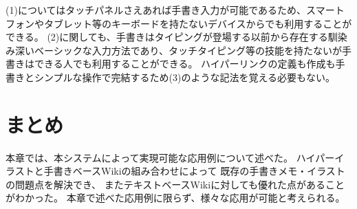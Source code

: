 (1)についてはタッチパネルさえあれば手書き入力が可能であるため、スマートフォンやタブレット等のキーボードを持たないデバイスからでも利用することができる。
(2)に関しても、手書きはタイピングが登場する以前から存在する馴染み深いベーシックな入力方法であり、タッチタイピング等の技能を持たないが手書きはできる人でも利用することができる。
ハイパーリンクの定義も作成も手書きとシンプルな操作で完結するため(3)のような記法を覚える必要もない。

\section{まとめ}
本章では、本システムによって実現可能な応用例について述べた。
ハイパーイラストと手書きベースWikiの組み合わせによって 既存の手書きメモ・イラストの問題点を解決でき、
またテキストベースWikiに対しても優れた点があることがわかった。
本章で述べた応用例に限らず、様々な応用が可能と考えられる。